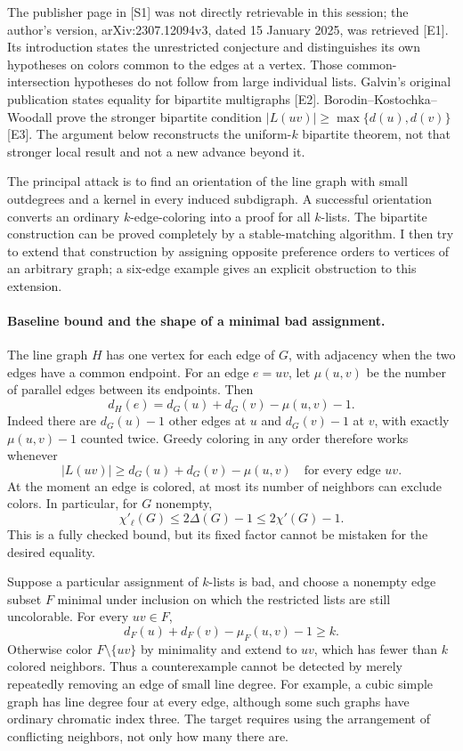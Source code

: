 \documentclass[11pt]{article}
\begin{document}
The publisher page in [S1] was not directly retrievable in this session;
the author's version, arXiv:2307.12094v3, dated 15 January 2025, was
retrieved [E1]. Its introduction states the unrestricted conjecture and
distinguishes its own hypotheses on colors common to the edges at a
vertex. Those common-intersection hypotheses do not follow from large
individual lists. Galvin's original publication states equality for
bipartite multigraphs [E2]. Borodin--Kostochka--Woodall prove the stronger
bipartite condition $|L(uv)|\geq\max\{d(u),d(v)\}$ [E3]. The argument
below reconstructs the uniform-$k$ bipartite theorem, not that stronger
local result and not a new advance beyond it.

The principal attack is to find an orientation of the line graph with
small outdegrees and a kernel in every induced subdigraph. A successful
orientation converts an ordinary $k$-edge-coloring into a proof for all
$k$-lists. The bipartite construction can be proved completely by a
stable-matching algorithm. I then try to extend that construction by
assigning opposite preference orders to vertices of an arbitrary graph;
a six-edge example gives an explicit obstruction to this extension.

\paragraph{Baseline bound and the shape of a minimal bad assignment.}
The line graph $H$ has one vertex for each edge of $G$, with adjacency when
the two edges have a common endpoint. For an edge $e=uv$, let $\mu(u,v)$
be the number of parallel edges between its endpoints. Then
\begin{equation}\label{ra496:line-degree}
 d_H(e)=d_G(u)+d_G(v)-\mu(u,v)-1.
\end{equation}
Indeed there are $d_G(u)-1$ other edges at $u$ and $d_G(v)-1$ at $v$,
with exactly $\mu(u,v)-1$ counted twice. Greedy coloring in any order
therefore works whenever
\[
 |L(uv)|\geq d_G(u)+d_G(v)-\mu(u,v)
 \quad\text{for every edge }uv.
\]
At the moment an edge is colored, at most its number of neighbors can
exclude colors. In particular, for $G$ nonempty,
\begin{equation}\label{ra496:greedy}
 \chi'_\ell(G)\leq2\Delta(G)-1\leq2\chi'(G)-1.
\end{equation}
This is a fully checked bound, but its fixed factor cannot be mistaken
for the desired equality.

Suppose a particular assignment of $k$-lists is bad, and choose a nonempty
edge subset $F$ minimal under inclusion on which the restricted lists are
still uncolorable. For every $uv\in F$,
\begin{equation}\label{ra496:critical}
 d_F(u)+d_F(v)-\mu_F(u,v)-1\geq k.
\end{equation}
Otherwise color $F\setminus\{uv\}$ by minimality and extend to $uv$,
which has fewer than $k$ colored neighbors. Thus a counterexample cannot
be detected by merely repeatedly removing an edge of small line degree.
For example, a cubic simple graph has line degree four at every edge,
although some such graphs have ordinary chromatic index three. The
target requires using the arrangement of conflicting neighbors, not
only how many there are.
\end{document}
